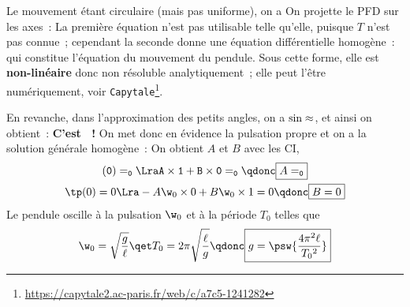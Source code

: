 \documentclass[../../main/main.tex]{subfiles}
\begin{document}
\begin{minipage}{0.25\linewidth}
\begin{center}
{    }
    \vspace{-15pt}
	\end{center}
\end{minipage}
\begin{enumerate}[label=\sqenumi, start=4]
  \psw{
      \[
      \begin{array}{ll}
        \textbf{Poids}   & \Pf = m\gf = mg(\cos\tt \ur - \sin\tt \ut)
        \\
        \textbf{Tension} & \Tf = -T\ur
      \end{array}
    \]
  }
	\psw{
	  \[m\af = \Pf + \Tf\]
	}
	Le mouvement étant circulaire (mais pas uniforme), on a
	\psw{
	  \[\af = -\ell\tp^2 \ur + \ell\tpp \ut\]
	}
	 On projette le PFD sur les axes~:
  \psw{
      \[
      \left\{
      \begin{array}{rcl}
        -m\ell\tp^2 & = & mg\cos\tt - T \\
        m\ell\tpp   & = & -mg\sin\tt
      \end{array}
      \right.
    \]
  }
	 La première équation n'est pas utilisable telle qu'elle,
	puisque $T$ n'est pas connue~; cependant la seconde donne une équation
	différentielle homogène~:
  \psw{
      \[\boxed{\tpp + \frac{g}{\ell}\sin\tt = 0}\]
  }
	qui constitue l'équation du mouvement du pendule. Sous cette forme, elle
	est \textbf{non-linéaire} donc non résoluble analytiquement~; elle peut
	l'être numériquement, voir
	\texttt{Capytale}\footnote{\url{
			https://capytale2.ac-paris.fr/web/c/a7c5-1241282}}.
\end{enumerate}
En revanche, dans l'approximation des petits angles, on a $\sin\tt\approx\tt$,
et ainsi on obtient~:
\psw{
  \[\boxed{\tpp + \frac{g}{\ell}\tt = 0}\]
}
\textbf{C'est ~!} On
met donc en évidence la pulsation propre
\psw{
  \[\w_0 = \sqrt{\frac{g}{\ell}}\]
}
et on a la solution générale homogène~:
\psw{
  \[\tt(t) = A\cos(\w_0t) + B\sin(\w_0t)\]
}
On obtient $A$ et $B$ avec les CI,
\begin{gather*}
	\tt(0) = \tt_0
	\Lra A\times 1 + B\times 0 = \tt_0
	\qdonc
	\boxed{A = \tt_0}\\
	\tp(0) = 0
	\Lra -A\w_0\times 0 + B\w_0\times 1 = 0
	\qdonc
	\boxed{B = 0}
\end{gather*}
Le pendule oscille à la pulsation $\w_0$ et à la période $T_0$ telles que
\[
	\w_0 = \sqrt{\frac{g}{\ell}}
	\qet
	T_0 = 2\pi \sqrt{\frac{\ell}{g}}
	\qdonc
	\boxed{g = \psw{\frac{4\pi^2\ell}{T_0{}^2}}}
\]
\end{document}
